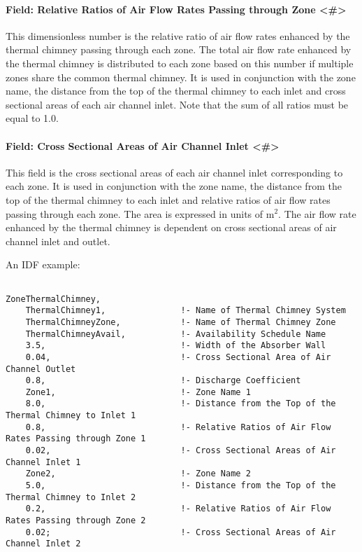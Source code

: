\paragraph{Field: Relative Ratios of Air Flow Rates Passing through Zone \textless{}\#\textgreater{}}\label{field-relative-ratios-of-air-flow-rates-passing-through-zone}

This dimensionless number is the relative ratio of air flow rates enhanced by the thermal chimney passing through each zone. The total air flow rate enhanced by the thermal chimney is distributed to each zone based on this number if multiple zones share the common thermal chimney. It is used in conjunction with the zone name, the distance from the top of the thermal chimney to each inlet and cross sectional areas of each air channel inlet. Note that the sum of all ratios must be equal to 1.0.

\paragraph{Field: Cross Sectional Areas of Air Channel Inlet \textless{}\#\textgreater{}}\label{field-cross-sectional-areas-of-air-channel-inlet}

This field is the cross sectional areas of each air channel inlet corresponding to each zone. It is used in conjunction with the zone name, the distance from the top of the thermal chimney to each inlet and relative ratios of air flow rates passing through each zone. The area is expressed in units of m\(^{2}\). The air flow rate enhanced by the thermal chimney is dependent on cross sectional areas of air channel inlet and outlet.

An IDF example:

\begin{lstlisting}

ZoneThermalChimney,
    ThermalChimney1,               !- Name of Thermal Chimney System
    ThermalChimneyZone,            !- Name of Thermal Chimney Zone
    ThermalChimneyAvail,           !- Availability Schedule Name
    3.5,                           !- Width of the Absorber Wall
    0.04,                          !- Cross Sectional Area of Air Channel Outlet
    0.8,                           !- Discharge Coefficient
    Zone1,                         !- Zone Name 1
    8.0,                           !- Distance from the Top of the Thermal Chimney to Inlet 1
    0.8,                           !- Relative Ratios of Air Flow Rates Passing through Zone 1
    0.02,                          !- Cross Sectional Areas of Air Channel Inlet 1
    Zone2,                         !- Zone Name 2
    5.0,                           !- Distance from the Top of the Thermal Chimney to Inlet 2
    0.2,                           !- Relative Ratios of Air Flow Rates Passing through Zone 2
    0.02;                          !- Cross Sectional Areas of Air Channel Inlet 2
\end{lstlisting}

